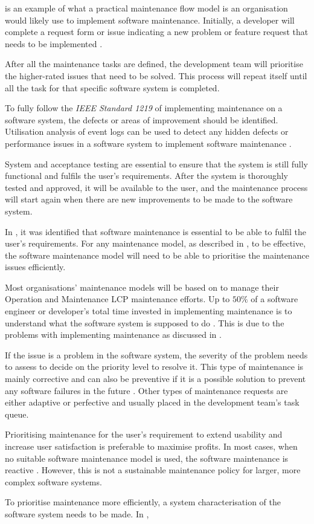  is an example of what a practical maintenance flow model is an organisation would likely use to implement software maintenance. Initially, a developer will complete a request form or issue indicating a new problem or feature request that needs to be implemented \cite{Tang2010}.\par After all the maintenance tasks are defined, the development team will prioritise the higher-rated issues that need to be solved. This process will repeat itself until all the task for that specific software system is completed.\par To fully follow the \textit{IEEE Standard 1219} of implementing maintenance on a software system, the defects or areas of improvement should be identified. Utilisation analysis of event logs can be used to detect any hidden defects or performance issues in a software system to implement software maintenance \cite{Cinque2013, Rong2018a, Levin2019}.\par System and acceptance testing are essential to ensure that the system is still fully functional and fulfils the user's requirements. After the system is thoroughly tested and approved, it will be available to the user, and the maintenance process will start again when there are new improvements to be made to the software system.\par In , it was identified that software maintenance is essential to be able to fulfil the user's requirements. For any maintenance model, as described in , to be effective, the software maintenance model will need to be able to prioritise the maintenance issues efficiently. \par Most organisations' maintenance models will be based on  to manage their Operation and Maintenance LCP maintenance efforts. Up to $50\%$ of a software engineer or developer's total time invested in implementing maintenance is to understand what the software system is supposed to do \cite{Tang2010}. This is due to the problems with implementing maintenance as discussed in .\par If the issue is a problem in the software system, the severity of the problem needs to assess to decide on the priority level to resolve it. This type of maintenance is mainly corrective and can also be preventive if it is a possible solution to prevent any software failures in the future \cite{Tang2010}. Other types of maintenance requests are either adaptive or perfective and usually placed in the development team's task queue. \par Prioritising maintenance for the user's requirement to extend usability and increase user satisfaction is preferable to maximise profits. In most cases, when no suitable software maintenance model is used, the software maintenance is reactive \cite{Araujo2021}. However, this is not a sustainable maintenance policy for larger, more complex software systems. \par To prioritise maintenance more efficiently, a system characterisation of the software system needs to be made. In , 